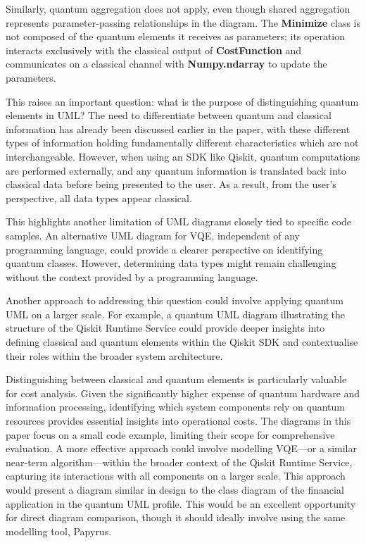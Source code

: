 \documentclass{article}
\begin{document}
Similarly, quantum aggregation does not apply, even though shared aggregation represents parameter-passing relationships in the diagram. The \textbf{Minimize} class is not composed of the quantum elements it receives as parameters; its operation interacts exclusively with the classical output of \textbf{CostFunction} and communicates on a classical channel with \textbf{Numpy.ndarray} to update the parameters.

This raises an important question: what is the purpose of distinguishing quantum elements in UML? The need to differentiate between quantum and classical information has already been discussed earlier in the paper, with these different types of information holding fundamentally different characteristics which are not interchangeable. However, when using an SDK like Qiskit, quantum computations are performed externally, and any quantum information is translated back into classical data before being presented to the user. As a result, from the user’s perspective, all data types appear classical. 

This highlights another limitation of UML diagrams closely tied to specific code samples. An alternative UML diagram for VQE, independent of any programming language, could provide a clearer perspective on identifying quantum classes. However, determining data types might remain challenging without the context provided by a programming language.

Another approach to addressing this question could involve applying quantum UML on a larger scale. For example, a quantum UML diagram illustrating the structure of the Qiskit Runtime Service could provide deeper insights into defining classical and quantum elements within the Qiskit SDK and contextualise their roles within the broader system architecture. 

Distinguishing between classical and quantum elements is particularly valuable for cost analysis. Given the significantly higher expense of quantum hardware and information processing, identifying which system components rely on quantum resources provides essential insights into operational costs.  The diagrams in this paper focus on a small code example, limiting their scope for comprehensive evaluation. A more effective approach could involve modelling VQE—or a similar near-term algorithm—within the broader context of the Qiskit Runtime Service, capturing its interactions with all components on a larger scale. This approach would present a diagram similar in design to the class diagram of the financial application in the quantum UML profile\cite{Pérez-Castillo2022}. This would be an excellent opportunity for direct diagram comparison, though it should ideally involve using the same modelling tool, Papyrus.
\end{document}
